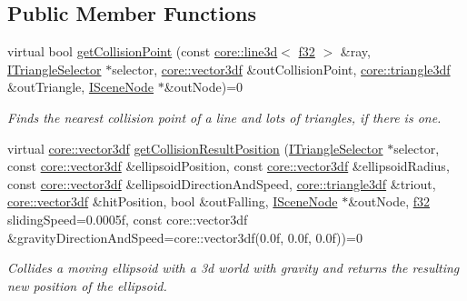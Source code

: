 \subsection*{Public Member Functions}
\begin{DoxyCompactItemize}
\item 
virtual bool \hyperlink{classirr_1_1scene_1_1ISceneCollisionManager_a0adcf9dca228fac89b085144141f33b0}{get\+Collision\+Point} (const \hyperlink{classirr_1_1core_1_1line3d}{core\+::line3d}$<$ \hyperlink{namespaceirr_a0277be98d67dc26ff93b1a6a1d086b07}{f32} $>$ \&ray, \hyperlink{classirr_1_1scene_1_1ITriangleSelector}{I\+Triangle\+Selector} $\ast$selector, \hyperlink{namespaceirr_1_1core_ae6e2b2a6c552833ebbd5b7463d03586b}{core\+::vector3df} \&out\+Collision\+Point, \hyperlink{namespaceirr_1_1core_a8983bda2678a7a67d97bf3c7be6c31c7}{core\+::triangle3df} \&out\+Triangle, \hyperlink{classirr_1_1scene_1_1ISceneNode}{I\+Scene\+Node} $\ast$\&out\+Node)=0
\begin{DoxyCompactList}\small\item\em Finds the nearest collision point of a line and lots of triangles, if there is one. \end{DoxyCompactList}\item 
virtual \hyperlink{namespaceirr_1_1core_ae6e2b2a6c552833ebbd5b7463d03586b}{core\+::vector3df} \hyperlink{classirr_1_1scene_1_1ISceneCollisionManager_a4a1b1bdf49ec8dd3d4de8b502409ee00}{get\+Collision\+Result\+Position} (\hyperlink{classirr_1_1scene_1_1ITriangleSelector}{I\+Triangle\+Selector} $\ast$selector, const \hyperlink{namespaceirr_1_1core_ae6e2b2a6c552833ebbd5b7463d03586b}{core\+::vector3df} \&ellipsoid\+Position, const \hyperlink{namespaceirr_1_1core_ae6e2b2a6c552833ebbd5b7463d03586b}{core\+::vector3df} \&ellipsoid\+Radius, const \hyperlink{namespaceirr_1_1core_ae6e2b2a6c552833ebbd5b7463d03586b}{core\+::vector3df} \&ellipsoid\+Direction\+And\+Speed, \hyperlink{namespaceirr_1_1core_a8983bda2678a7a67d97bf3c7be6c31c7}{core\+::triangle3df} \&triout, \hyperlink{namespaceirr_1_1core_ae6e2b2a6c552833ebbd5b7463d03586b}{core\+::vector3df} \&hit\+Position, bool \&out\+Falling, \hyperlink{classirr_1_1scene_1_1ISceneNode}{I\+Scene\+Node} $\ast$\&out\+Node, \hyperlink{namespaceirr_a0277be98d67dc26ff93b1a6a1d086b07}{f32} sliding\+Speed=0.\+0005f, const core\+::vector3df \&gravity\+Direction\+And\+Speed=core\+::vector3df(0.\+0f, 0.\+0f, 0.\+0f))=0
\begin{DoxyCompactList}\small\item\em Collides a moving ellipsoid with a 3d world with gravity and returns the resulting new position of the ellipsoid. \end{DoxyCompactList}\item 

\end{DoxyCompactItemize}
